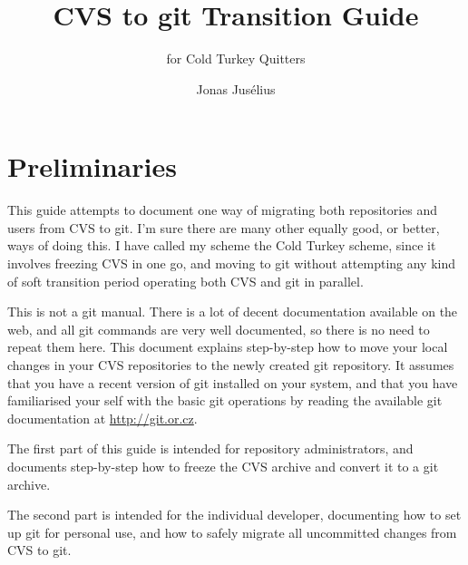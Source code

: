 \documentclass[a4paper,10pt]{article}
\begin{document}
\pagestyle{fancy}
\fancyfoot{}
\fancyhead{}
\renewcommand{\sectionmark}[1]{\markboth{\sf\thesection.\ #1}{}}
\renewcommand{\subsectionmark}[1]{}
\fancyhead[R]{{\rmfamily\thepage}}

\title{CVS to git Transition Guide}

\subtitle{for Cold Turkey Quitters}
\author{{\sf Jonas Jus\'elius}}
\address{
{\tt <jonas.juselius@chem.uit.no>}\\
{\sf University of Tromsø}\\
{\sf Department of Chemistry}\\
{\sf N-9037 University of Tromsø, Norway}
}

\maketitle

\section{Preliminaries}
This guide attempts to document one way of migrating both repositories and 
users from  CVS to git. 
I'm sure there are many other equally good, or better, ways of doing 
this. I have called my scheme the Cold Turkey scheme, since it involves
freezing CVS in one go, and moving to git without attempting any kind of soft
transition period operating both CVS and git in parallel. 

This is not a git manual. There is a lot of decent
documentation available on the web, and all git commands are very well
documented, so there is no need to repeat them here. 
This document explains step-by-step how to move your local changes
in your CVS repositories to the newly created git repository. It assumes that
you have a recent version of git installed on your system, and that you have
familiarised your self with the basic git operations by reading the available
git documentation at \url{http://git.or.cz}. 

The first part of this guide is intended for repository administrators, and
documents step-by-step how to freeze the CVS archive and convert it to a git
archive. 

The second part is intended for the individual developer, documenting how to
set up git for personal use, and how to safely migrate all uncommitted changes
from CVS to git.
\end{document}
